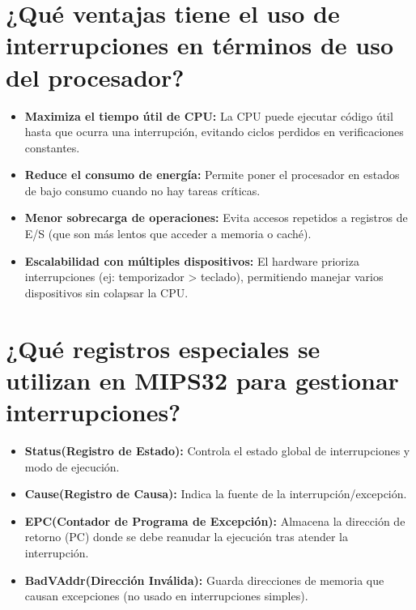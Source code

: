 \documentclass{article}
\begin{document}
\section*{¿Qué ventajas tiene el uso de interrupciones en términos de uso del procesador?}

\begin{itemize}
    \item \textbf{Maximiza el tiempo útil de CPU: }La CPU puede ejecutar código útil hasta que ocurra una interrupción, evitando ciclos perdidos en verificaciones constantes.

    \item \textbf{Reduce el consumo de energía: }Permite poner el procesador en estados de bajo consumo cuando no hay tareas críticas.

    \item \textbf{Menor sobrecarga de operaciones: }Evita accesos repetidos a registros de E/S (que son más lentos que acceder a memoria o caché).

    \item \textbf{Escalabilidad con múltiples dispositivos: }El hardware prioriza interrupciones (ej: temporizador > teclado), permitiendo manejar varios dispositivos sin colapsar la CPU.

\end{itemize}

\section*{¿Qué registros especiales se utilizan en MIPS32 para gestionar interrupciones?}

\begin{itemize}
    \item \textbf{Status(Registro de Estado): }Controla el estado global de interrupciones y modo de ejecución.

    \item \textbf{Cause(Registro de Causa): }Indica la fuente de la interrupción/excepción.

    \item \textbf{EPC(Contador de Programa de Excepción): }Almacena la dirección de retorno (PC) donde se debe reanudar la ejecución tras atender la interrupción.

    \item \textbf{BadVAddr(Dirección Inválida): }Guarda direcciones de memoria que causan excepciones (no usado en interrupciones simples).

\end{itemize}
\end{document}
